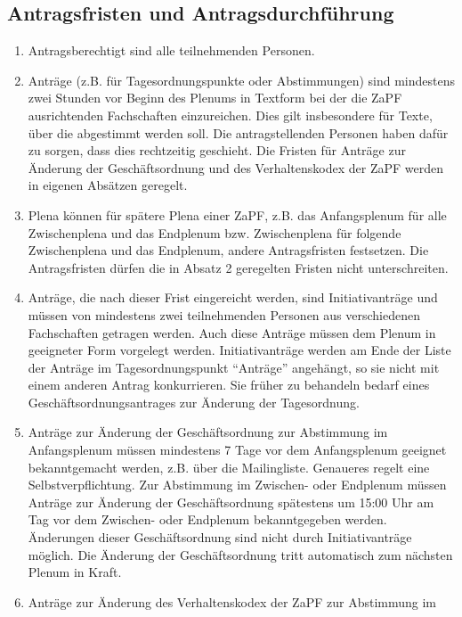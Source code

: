 \documentclass[
  ngerman,
  a4paper,
  oneside]{scrartcl}
\providecommand{\tightlist}{%
  \setlength{\itemsep}{0pt}\setlength{\parskip}{0pt}}
\begin{document}
\subsection{Antragsfristen und
Antragsdurchführung}\label{antragsfristen-und-antragsdurchfuxfchrung}

\begin{enumerate}
\def\labelenumi{\arabic{enumi}.}
\tightlist
\item
  Antragsberechtigt sind alle teilnehmenden Personen.
\item
  Anträge (z.B. für Tagesordnungspunkte oder Abstimmungen) sind
  mindestens zwei Stunden vor Beginn des Plenums in Textform bei der die
  ZaPF ausrichtenden Fachschaften einzureichen. Dies gilt insbesondere
  für Texte, über die abgestimmt werden soll. Die antragstellenden
  Personen haben dafür zu sorgen, dass dies rechtzeitig geschieht. Die
  Fristen für Anträge zur Änderung der Geschäftsordnung und des
  Verhaltenskodex der ZaPF werden in eigenen Absätzen geregelt.
\item
  Plena können für spätere Plena einer ZaPF, z.B. das Anfangsplenum für
  alle Zwischenplena und das Endplenum bzw. Zwischenplena für folgende
  Zwischenplena und das Endplenum, andere Antragsfristen festsetzen. Die
  Antragsfristen dürfen die in Absatz 2 geregelten Fristen nicht
  unterschreiten.
\item
  Anträge, die nach dieser Frist eingereicht werden, sind
  Initiativanträge und müssen von mindestens zwei teilnehmenden Personen
  aus verschiedenen Fachschaften getragen werden. Auch diese Anträge
  müssen dem Plenum in geeigneter Form vorgelegt werden.
  Initiativanträge werden am Ende der Liste der Anträge im
  Tagesordnungspunkt ``Anträge'' angehängt, so sie nicht mit einem
  anderen Antrag konkurrieren. Sie früher zu behandeln bedarf eines
  Geschäftsordnungsantrages zur Änderung der Tagesordnung.
\item
  Anträge zur Änderung der Geschäftsordnung zur Abstimmung im
  Anfangsplenum müssen mindestens 7 Tage vor dem Anfangsplenum geeignet
  bekanntgemacht werden, z.B. über die Mailingliste. Genaueres regelt
  eine Selbstverpflichtung. Zur Abstimmung im Zwischen- oder Endplenum
  müssen Anträge zur Änderung der Geschäftsordnung spätestens um 15:00
  Uhr am Tag vor dem Zwischen- oder Endplenum bekanntgegeben werden.
  Änderungen dieser Geschäftsordnung sind nicht durch Initiativanträge
  möglich. Die Änderung der Geschäftsordnung tritt automatisch zum
  nächsten Plenum in Kraft.
\item
  Anträge zur Änderung des Verhaltenskodex der ZaPF zur Abstimmung im

\end{enumerate}
\end{document}
